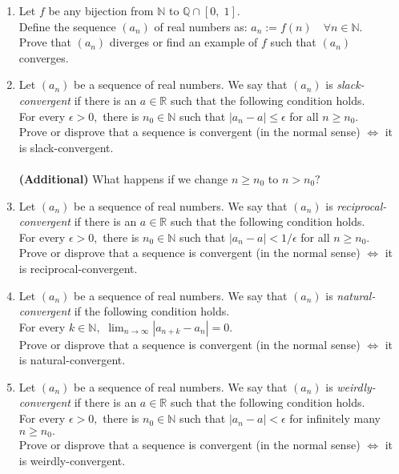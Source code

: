 \documentclass{article}
\begin{document}
\begin{enumerate}
	\item Let $f$ be any bijection from $\mathbb{N}$ to $\mathbb{Q} \cap [0,\; 1].$\\
	Define the sequence $(a_n)$ of real numbers as: $a_n := f(n) \quad \forall n \in \mathbb{N}.$\\
	Prove that $(a_n)$ diverges or find an example of $f$ such that $(a_n)$ converges.
	\item Let $(a_n)$ be a sequence of real numbers. We say that $(a_n)$ is \emph{slack-convergent} if there is an $a \in \mathbb{R}$ such that the following condition holds.\\
	For every $\epsilon > 0,$ there is $n_0 \in \mathbb{N}$ such that $|a_n - a| \le \epsilon$ for all $n \ge n_0.$\\
	Prove or disprove that a sequence is convergent (in the normal sense) $\iff$ it is slack-convergent.\\~\\
	\textbf{(Additional)} What happens if we change $n \ge n_0$ to $n > n_0?$
	\item Let $(a_n)$ be a sequence of real numbers. We say that $(a_n)$ is \emph{reciprocal-convergent} if there is an $a \in \mathbb{R}$ such that the following condition holds.\\
	For every $\epsilon > 0,$ there is $n_0 \in \mathbb{N}$ such that $|a_n - a| < 1/\epsilon$ for all $n \ge n_0.$\\
	Prove or disprove that a sequence is convergent (in the normal sense) $\iff$ it is reciprocal-convergent.
	\item Let $(a_n)$ be a sequence of real numbers. We say that $(a_n)$ is \emph{natural-convergent} if the following condition holds.\\
	For every $k \in \mathbb{N},$ $\displaystyle\lim_{n\to \infty}|a_{n+k} - a_n| = 0.$\\
	Prove or disprove that a sequence is convergent (in the normal sense) $\iff$ it is natural-convergent.
	\item Let $(a_n)$ be a sequence of real numbers. We say that $(a_n)$ is \emph{weirdly-convergent} if there is an $a \in \mathbb{R}$ such that the following condition holds.\\
	For every $\epsilon > 0,$ there is $n_0 \in \mathbb{N}$ such that $|a_n - a| < \epsilon$ for infinitely many $n \ge n_0.$\\
	Prove or disprove that a sequence is convergent (in the normal sense) $\iff$ it is weirdly-convergent.

\end{enumerate}
\end{document}
